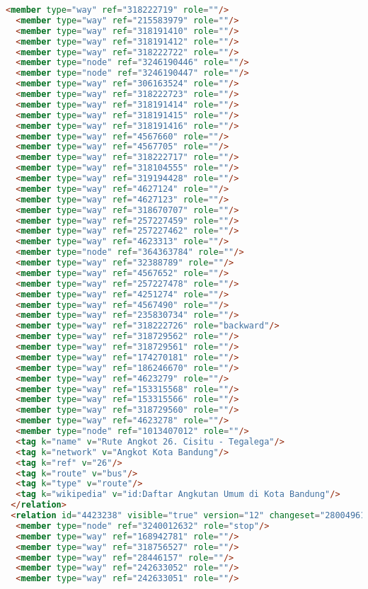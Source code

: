 \begin{lstlisting}[language=HTML,basicstyle=\tiny,caption=test.xml]
  <member type="way" ref="318222719" role=""/>
  <member type="way" ref="215583979" role=""/>
  <member type="way" ref="318191410" role=""/>
  <member type="way" ref="318191412" role=""/>
  <member type="way" ref="318222722" role=""/>
  <member type="node" ref="3246190446" role=""/>
  <member type="node" ref="3246190447" role=""/>
  <member type="way" ref="306163524" role=""/>
  <member type="way" ref="318222723" role=""/>
  <member type="way" ref="318191414" role=""/>
  <member type="way" ref="318191415" role=""/>
  <member type="way" ref="318191416" role=""/>
  <member type="way" ref="4567660" role=""/>
  <member type="way" ref="4567705" role=""/>
  <member type="way" ref="318222717" role=""/>
  <member type="way" ref="318104555" role=""/>
  <member type="way" ref="319194428" role=""/>
  <member type="way" ref="4627124" role=""/>
  <member type="way" ref="4627123" role=""/>
  <member type="way" ref="318670707" role=""/>
  <member type="way" ref="257227459" role=""/>
  <member type="way" ref="257227462" role=""/>
  <member type="way" ref="4623313" role=""/>
  <member type="node" ref="364363784" role=""/>
  <member type="way" ref="32388789" role=""/>
  <member type="way" ref="4567652" role=""/>
  <member type="way" ref="257227478" role=""/>
  <member type="way" ref="4251274" role=""/>
  <member type="way" ref="4567490" role=""/>
  <member type="way" ref="235830734" role=""/>
  <member type="way" ref="318222726" role="backward"/>
  <member type="way" ref="318729562" role=""/>
  <member type="way" ref="318729561" role=""/>
  <member type="way" ref="174270181" role=""/>
  <member type="way" ref="186246670" role=""/>
  <member type="way" ref="4623279" role=""/>
  <member type="way" ref="153315568" role=""/>
  <member type="way" ref="153315566" role=""/>
  <member type="way" ref="318729560" role=""/>
  <member type="way" ref="4623278" role=""/>
  <member type="node" ref="1013407012" role=""/>
  <tag k="name" v="Rute Angkot 26. Cisitu - Tegalega"/>
  <tag k="network" v="Angkot Kota Bandung"/>
  <tag k="ref" v="26"/>
  <tag k="route" v="bus"/>
  <tag k="type" v="route"/>
  <tag k="wikipedia" v="id:Daftar Angkutan Umum di Kota Bandung"/>
 </relation>
 <relation id="4423238" visible="true" version="12" changeset="28004961" timestamp="2015-01-08T20:02:58Z" user="isonpurba" uid="2552445">
  <member type="node" ref="3240012632" role="stop"/>
  <member type="way" ref="168942781" role=""/>
  <member type="way" ref="318756527" role=""/>
  <member type="way" ref="28446157" role=""/>
  <member type="way" ref="242633052" role=""/>
  <member type="way" ref="242633051" role=""/>

\end{lstlisting}
